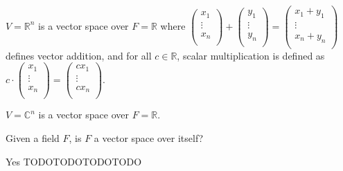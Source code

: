 \begin{eg}
    \(V=\mathbb{R}^n \) is a vector space over \(F=\mathbb{R} \) where \(\begin{pmatrix}
         x_1 \\
         \vdots \\
         x_n \\
    \end{pmatrix} + \begin{pmatrix}
         y_1 \\
         \vdots \\
         y_n \\
    \end{pmatrix} = \begin{pmatrix}
         x_1 + y _1 \\
         \vdots \\
         x_n + y_n \\
    \end{pmatrix}\) defines vector addition, and for all \(c \in \mathbb{R} \), scalar multiplication is defined as \(c \cdot \begin{pmatrix}
         x_1 \\
         \vdots \\
         x_n \\
    \end{pmatrix} = \begin{pmatrix}
         cx_1 \\
         \vdots \\
         cx_n \\
    \end{pmatrix}\).
\end{eg}
\begin{eg}
    \(V=\mathbb{C} ^n\) is a vector space over \(F=\mathbb{R} \).
\end{eg}
\begin{question}
    Given a field \(F\), is \(F\) a vector space over itself? 
\end{question}
\begin{explanation}
    Yes TODOTODOTODOTODO
\end{explanation}
